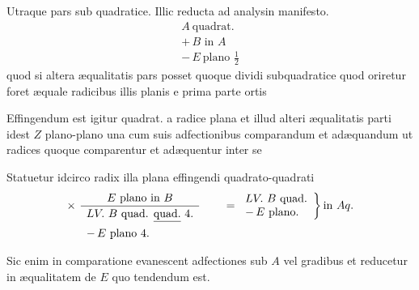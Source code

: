 \documentclass[11pt,a4paper]{article}
\begin{document}
Utraque pars  sub quadratice. Illic reducta ad analysin \ill{}  manifesto.
\[ \begin{array}{l} A\ \text{quadrat.} \\ +\,B \text{ in } A \\ -\,E\ \text{plano } \frac{1}{2} \end{array} \]
quod si altera æqualitatis pars posset quoque dividi subquadratice quod oriretur foret æquale radicibus illis planis e prima parte ortis

Effingendum est igitur quadrat. a radice plana et illud alteri æqualitatis parti idest $Z$ plano-plano una cum suis  adfectionibus comparandum et adæquandum ut radices quoque comparentur et adæquentur inter se

Statuetur idcirco radix illa plana effingendi quadrato-quadrati
\[ \times\ \dfrac{E\ \text{plano in } B}{\begin{array}{l} LV.\ B\ \text{quad. } \struck{\text{quad.}}\ 4. \\ -\,E\ \text{plano } 4. \end{array}} \qquad = \left.\begin{array}{l} LV.\ B\ \text{quad.} \\ -\,E\ \text{plano.} \end{array}\right\} \text{in } Aq. \]

Sic enim in comparatione evanescent adfectiones sub $A$ vel gradibus et reducetur in æqualitatem de $E$ quo tendendum est.

\end{document}
